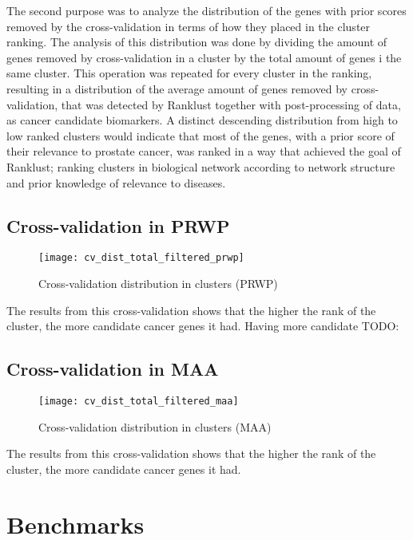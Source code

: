 The second purpose was to analyze the distribution of the genes with prior
scores removed by the cross-validation in terms of how they placed in the
cluster ranking. The analysis of this distribution was done by dividing the
amount of genes removed by cross-validation in a cluster by the total amount of
genes i the same cluster. This operation was repeated for every cluster in the
ranking, resulting in a distribution of the average amount of genes removed by
cross-validation, that was detected by Ranklust together with post-processing of
data, as cancer candidate biomarkers. A distinct descending distribution from
high to low ranked clusters would indicate that most of the genes, with a prior
score of their relevance to prostate cancer, was ranked in a way that achieved
the goal of Ranklust; ranking clusters in biological network according to
network structure and prior knowledge of relevance to diseases.

\subsection{Cross-validation in PRWP}
\begin{figure}[H]
    \label{fig:irefweb-prwp}
    \texttt{[image: cv\_dist\_total\_filtered\_prwp]}
    \caption{Cross-validation distribution in clusters (PRWP)}
\end{figure}
The results from this cross-validation shows that the higher the rank of the
cluster, the more candidate cancer genes it had. Having more candidate TODO:

\subsection{Cross-validation in MAA}
\begin{figure}[H]
    \label{fig:irefweb-maa}
    \texttt{[image: cv\_dist\_total\_filtered\_maa]}
    \caption{Cross-validation distribution in clusters (MAA)}
\end{figure}
The results from this cross-validation shows that the higher the rank of the
cluster, the more candidate cancer genes it had.

\section{Benchmarks}
